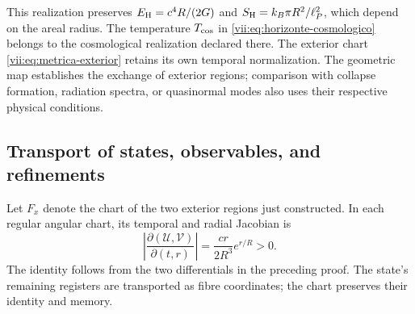 This realization preserves
\(E_{\rm H}=c^4R/(2G)\) and
\(S_{\rm H}=k_B\pi R^2/\ell_P^2\), which depend on the areal radius.
The temperature \(T_{\rm cos}\) in
\eqref{vii:eq:horizonte-cosmologico} belongs to the cosmological
realization declared there. The exterior chart
\eqref{vii:eq:metrica-exterior} retains its own temporal normalization.
The geometric map establishes the exchange of exterior regions; comparison
with collapse formation, radiation spectra, or quasinormal modes
also uses their respective physical conditions.

\subsection{Transport of states, observables, and refinements}
\label{vii:subsec:transporte-informacion-horizonte}

Let \(F_x\) denote the chart of the two exterior regions just constructed.
In each regular angular chart, its temporal and radial Jacobian is
\begin{equation}
 \left|\frac{\partial(\mathcal U,\mathcal V)}{\partial(t,r)}\right|
 =\frac{cr}{2R^3}e^{r/R}>0.
 \label{vii:eq:jacobiano-kruskal}
\end{equation}
The identity follows from the two differentials in the preceding proof.
The state's remaining registers are transported as fibre
coordinates; the chart preserves their identity and memory.


